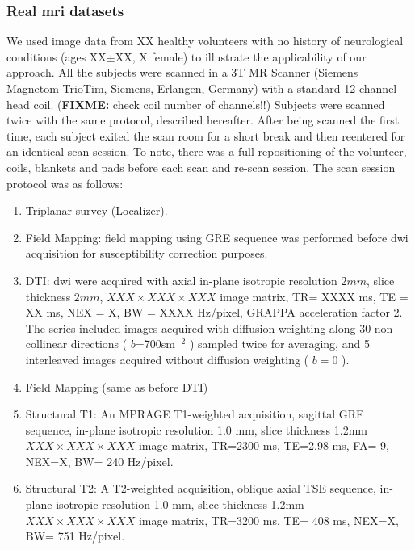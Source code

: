 \subsubsection{Real \gls{mri} datasets} %
%
We used image data from XX healthy volunteers with no history of neurological
conditions (ages XX$\pm$XX, X female) to illustrate the applicability of our 
approach. All the subjects were scanned in a 3T MR Scanner (Siemens Magnetom
TrioTim, Siemens, Erlangen, Germany) with a standard 12-channel head coil. 
(\textbf{FIXME:} check coil number of channels!!)
Subjects were scanned twice with the same protocol,
described hereafter. After being scanned the first time, each subject exited the
scan room for a short break and then reentered for an identical scan session.
To note, there was a full repositioning of the volunteer, coils, blankets and pads
before each scan and re-scan session. The scan session protocol was as follows:
\begin{enumerate}
\item Triplanar survey (Localizer).
\item Field Mapping: field mapping using GRE sequence was performed before \gls{dwi}
acquisition for susceptibility correction purposes.
\item DTI: \gls{dwi} were acquired with axial in-plane 
isotropic resolution $2mm$, slice thickness $2mm$, $XXX \times XXX \times XXX$ 
image matrix, TR= XXXX ms, TE = XX ms, NEX = X, BW = XXXX Hz/pixel, GRAPPA
acceleration factor 2. The series included images acquired with diffusion
weighting along 30 non-collinear directions ( $b$=700sm$^{-2}$ ) sampled
twice for averaging, and 5 interleaved images acquired without diffusion 
weighting ( $b=0$ ).
\item Field Mapping (same as before DTI)
\item Structural T1: An MPRAGE T1-weighted acquisition, sagittal
GRE sequence, in-plane isotropic resolution 1.0 mm, slice thickness 1.2mm
$XXX \times XXX \times XXX$ image matrix, TR=2300 ms, TE=2.98 ms, FA= 9, NEX=X, BW= 240 Hz/pixel.
\item Structural T2: A T2-weighted acquisition, oblique axial
TSE sequence, in-plane isotropic resolution 1.0 mm, slice thickness 1.2mm
$XXX \times XXX \times XXX$ image matrix, TR=3200 ms, TE= 408 ms, NEX=X, BW= 751 Hz/pixel.
\end{enumerate}


